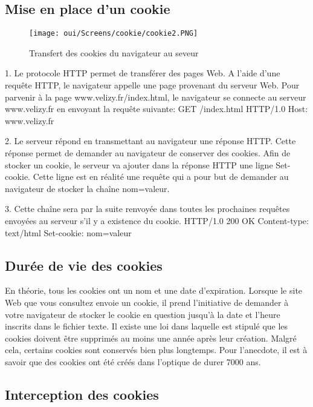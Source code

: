 \subsection{Mise en place d’un cookie}

\begin{figure}[htp!]
  \centering
  \setlength\figureheight{7cm}
  \setlength\figurewidth{9cm}
  \texttt{[image: oui/Screens/cookie/cookie2.PNG]}
   \caption{Transfert des cookies du navigateur au seveur}
  \label{fig:courbe-tikz}
\end{figure}

1. Le protocole HTTP permet de transférer des pages Web. A l’aide d’une requête HTTP, le navigateur appelle une page provenant du serveur Web.
Pour parvenir à la page www.velizy.fr/index.html, le navigateur se connecte au serveur www.velizy.fr en envoyant la requête suivante:
GET /index.html HTTP/1.0
Host: www.velizy.fr

2. Le serveur répond en transmettant au navigateur une réponse HTTP.
Cette réponse permet de demander au navigateur de conserver des cookies.
Afin de stocker un cookie, le serveur va ajouter dans la réponse HTTP une ligne Set-cookie. Cette ligne est en réalité une requête qui a pour but de demander au navigateur de stocker la chaîne nom=valeur.

3. Cette chaîne sera par la suite renvoyée dans toutes les prochaines requêtes envoyées au serveur s'il y a existence du cookie.
HTTP/1.0 200 OK
Content-type: text/html
Set-cookie: nom=valeur

\subsection{Durée de vie des cookies}

En théorie, tous les cookies ont un nom et une date d’expiration. 
Lorsque le site Web que vous consultez envoie un cookie, il prend l’initiative de demander à votre navigateur de stocker le cookie en question jusqu’à la date et l’heure inscrits dans le fichier texte. Il existe une loi dans laquelle est stipulé que les cookies doivent être supprimés au moins une année après leur création. Malgré cela, certains cookies sont conservés bien plus longtemps. Pour l’anecdote, il est à savoir que des cookies ont été créés dans l’optique de durer 7000 ans.

\subsection{Interception des cookies}

